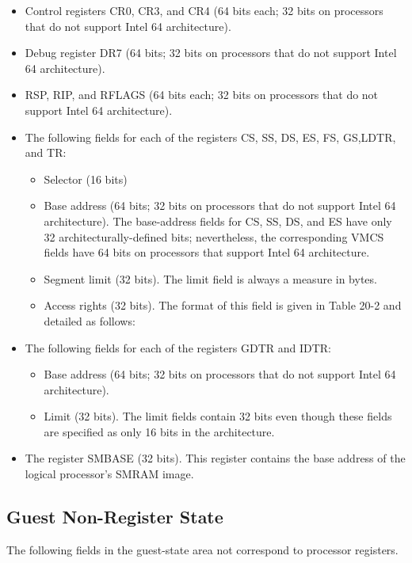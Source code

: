 \documentclass[10pt,draftclsnofoot,journal,compsoc,onecolumn]{IEEEtran}
\begin{document}
	\begin{itemize}
		\item Control registers CR0, CR3, and CR4 (64 bits each; 32 bits on processors that do not support Intel 64 architecture).
		\item Debug register DR7 (64 bits; 32 bits on processors that do not support Intel 64 architecture).
		\item RSP, RIP, and RFLAGS (64 bits each; 32 bits on processors that do not support Intel 64 architecture).
		\item The following fields for each of the registers CS, SS, DS, ES, FS, GS,LDTR, and TR:
		
		\begin{itemize}
			\item Selector (16 bits)
			\item Base address (64 bits; 32 bits on processors that do not support Intel
			64 architecture). The base-address fields for CS, SS, DS, and ES have only 32 architecturally-defined bits; nevertheless, the corresponding VMCS fields have 64 bits on processors that support Intel 64 architecture.
			\item Segment limit (32 bits). The limit field is always a measure in bytes.
			\item Access rights (32 bits). The format of this field is given in Table 20-2 and detailed as follows:
		\end{itemize}
		
		\item The following fields for each of the registers GDTR and IDTR:
		
		\begin{itemize}
			\item Base address (64 bits; 32 bits on processors that do not support Intel
			64 architecture).
			\item Limit (32 bits). The limit fields contain 32 bits even though these
			fields are specified as only 16 bits in the architecture.
		\end{itemize}
		
		\item The register SMBASE (32 bits). This register contains the base address
		of the logical processor’s SMRAM image.
	\end{itemize}
	
	\subsection{Guest Non-Register State}
	The following fields in the guest-state area not correspond to processor registers.
	
\end{document}
